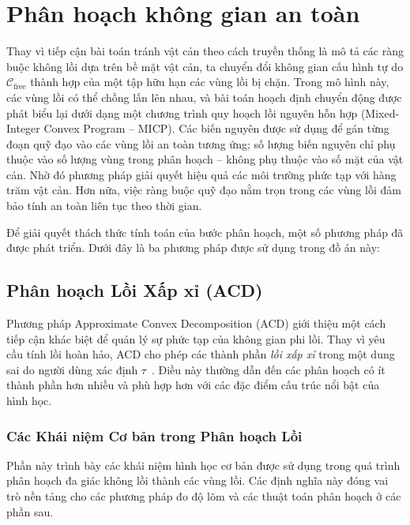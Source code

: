 \section{Phân hoạch không gian an toàn}
\label{sec:space_decomp}

Thay vì tiếp cận bài toán tránh vật cản theo cách truyền thống là mô tả các ràng buộc không lồi dựa trên bề mặt vật cản, ta chuyển đổi không gian cấu hình tự do $\mathcal{C}_{\mathrm{free}}$ thành hợp của một tập hữu hạn các vùng lồi bị chặn. Trong mô hình này, các vùng lồi có thể chồng lấn lên nhau, và bài toán hoạch định chuyển động được phát biểu lại dưới dạng một chương trình quy hoạch lồi nguyên hỗn hợp (Mixed-Integer Convex Program -- MICP). Các biến nguyên được sử dụng để gán từng đoạn quỹ đạo vào các vùng lồi an toàn tương ứng; số lượng biến nguyên chỉ phụ thuộc vào số lượng vùng trong phân hoạch -- không phụ thuộc vào số mặt của vật cản. Nhờ đó phương pháp giải quyết hiệu quả các môi trường phức tạp với hàng trăm vật cản. Hơn nữa, việc ràng buộc quỹ đạo nằm trọn trong các vùng lồi đảm bảo tính an toàn liên tục theo thời gian.

Để giải quyết thách thức tính toán của bước phân hoạch, một số phương pháp đã được phát triển. Dưới đây là ba phương pháp được sử dụng trong đồ án này:

\subsection{Phân hoạch Lồi Xấp xỉ (ACD)}

Phương pháp Approximate Convex Decomposition (ACD) giới thiệu một cách tiếp cận khác biệt để quản lý sự phức tạp của không gian phi lồi. Thay vì yêu cầu tính lồi hoàn hảo, ACD cho phép các thành phần \textit{lồi xấp xỉ} trong một dung sai do người dùng xác định $\tau$~\cite{LienAmato2006}. Điều này thường dẫn đến các phân hoạch có ít thành phần hơn nhiều và phù hợp hơn với các đặc điểm cấu trúc nổi bật của hình học.

\subsubsection{Các Khái niệm Cơ bản trong Phân hoạch Lồi}
\label{subsubsec:acd_basic_concepts}

Phần này trình bày các khái niệm hình học cơ bản được sử dụng trong quá trình phân hoạch đa giác không lồi thành các vùng lồi.
Các định nghĩa này đóng vai trò nền tảng cho các phương pháp đo độ lõm và các thuật toán phân hoạch ở các phần sau.

